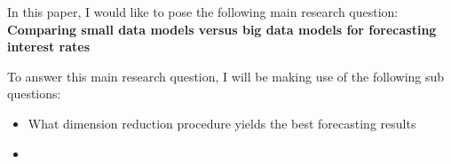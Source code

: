 In this paper, I would like to pose the following main research question:
\textbf{Comparing small data models versus big data models for forecasting interest rates}

To answer this main research question, I will be making use of the following sub questions:
\begin{itemize}
	\item What dimension reduction procedure yields the best forecasting results
	\item 
\end{itemize}